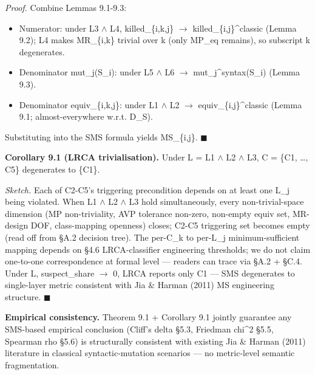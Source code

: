 \documentclass[review,12pt,authoryear]{elsarticle}
\providecommand{\tightlist}{\setlength{\itemsep}{0pt}\setlength{\parskip}{0pt}}
\begin{document}
\emph{Proof.} Combine Lemmas 9.1-9.3:

\begin{itemize}
\tightlist
\item
  Numerator: under L3 $\wedge$ L4, killed\_\{i,k,j\} $\to$
  killed\_\{i,j\}\^{}classic (Lemma 9.2); L4 makes MR\_\{i,k\} trivial
  over k (only MP\_eq remains), so subscript k degenerates.
\item
  Denominator \textbar mut\_j(S\_i)\textbar: under L5 $\wedge$ L6 $\to$
  \textbar mut\_j\^{}syntax(S\_i)\textbar{} (Lemma 9.3).
\item
  Denominator \textbar equiv\_\{i,k,j\}\textbar: under L1 $\wedge$ L2 $\to$
  \textbar equiv\_\{i,j\}\^{}classic\textbar{} (Lemma 9.1;
  almost-everywhere w.r.t. D\_S).
\end{itemize}

Substituting into the SMS formula yields MS\_\{i,j\}. $\blacksquare$

\textbf{Corollary 9.1 (LRCA trivialisation).} Under L = L1 $\wedge$ L2 $\wedge$ L3, C
= \{C1, \ldots, C5\} degenerates to \{C1\}.

\emph{Sketch.} Each of C2-C5's triggering precondition depends on at
least one L\_j being violated. When L1 $\wedge$ L2 $\wedge$ L3 hold simultaneously,
every non-trivial-space dimension (MP non-triviality, AVP tolerance
non-zero, non-empty equiv set, MR-design DOF, class-mapping openness)
closes; C2-C5 triggering set becomes empty (read off from §A.2 decision
tree). The per-C\_k to per-L\_j minimum-sufficient mapping depends on
§4.6 LRCA-classifier engineering thresholds; we do not claim one-to-one
correspondence at formal level --- readers can trace via §A.2 + §C.4.
Under L, suspect\_share $\to$ 0, LRCA reports only C1 --- SMS degenerates to
single-layer metric consistent with Jia \& Harman (2011) MS engineering
structure. $\blacksquare$

\textbf{Empirical consistency.} Theorem 9.1 + Corollary 9.1 jointly
guarantee any SMS-based empirical conclusion (Cliff's delta §5.3,
Friedman chi\^{}2 §5.5, Spearman rho §5.6) is structurally consistent
with existing Jia \& Harman (2011) literature in classical
syntactic-mutation scenarios --- no metric-level semantic fragmentation.
\end{document}
